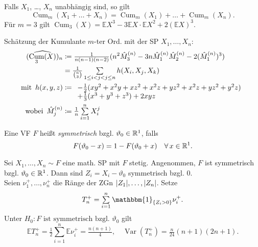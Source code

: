 \documentclass{cheat-sheet}
\newcommand{\E}{\mathbb{E}} %
\newcommand{\ind}{\mathbbm{1}} %
\DeclareMathOperator{\Cum}{Cum} %
\DeclareMathOperator{\var}{Var} %
\begin{document}
\begin{bem}
  Falls $X_1$, \ldots, $X_n$ unabhängig sind, so gilt
  \[ \Cum_m(X_1 + \ldots + X_n) = \Cum_m(X_1) + \ldots + \Cum_m(X_n). \]
  Für $m=3$ gilt $\Cum_3(X) = \E X^3 - 3 \E X \cdot \E X^2 + 2 (\E X)^3$.
\end{bem}

\begin{bsp}
  Schätzung der Kumulante $m$-ter Ord. mit der SP $X_1, \ldots, X_n$:
  \begin{align*}
    (\widehat{\Cum_3(X)})_n & \coloneqq \tfrac{1}{n (n-1) (n-2)} (n^2 \hat{M}_3^{(n)} - 3 n \hat{M}_1^{(n)} \hat{M}_2^{(n)} - 2 (\hat{M}_1^{(n)})^3) \\
    & = \tfrac{1}{\binom{n}{3}} \sum_{1 \leq i < j < j \leq n} h(X_i, X_j, X_k) \\
    \text{mit} \enspace
    h(x, y, z) & \coloneqq \begin{array}[t]{l}
      - \tfrac{1}{2} (xy^2 + x^2 y + x z^2 + x^2 z + y z^2 + x^2 z + y z^2 + y^2 z) \\
      + \tfrac{1}{3} (x^3 + y^3 + z^3) + 2 xyz
    \end{array} \\
    \enspace \text{wobei} \enspace
    \hat{M}_j^{(n)} & \coloneqq \tfrac{1}{n} \sum_{i=1}^n X_i^j
  \end{align*}
\end{bsp}

\begin{defn}
  Eine VF $F$ heißt \emph{symmetrisch} bzgl. $\vartheta_0 \in \mathbb{R}^1$, falls
  \[
    F(\vartheta_0 - x) = 1 - F(\vartheta_0 + x) \quad
    \forall \, x \in \mathbb{R}^1.
  \]
\end{defn}

\begin{bsp}
  Sei $X_1, \ldots, X_n \sim F$ eine math. SP mit $F$ stetig.
  Angenommen, $F$ ist symmetrisch bzgl. $\vartheta_0 \in \mathbb{R}^1$.
  Dann sind $Z_i = X_i - \vartheta_0$ symmetrisch bzgl. $0$. \\
  Seien $\nu_1^{+}, \ldots, \nu_n^{+}$ die Ränge der ZGn $\lvert Z_1\rvert, \ldots, \lvert Z_n\rvert$.
  Setze
  \[ T_n^{+} = \sum_{i=1}^n \ind_{\{ Z_i > 0 \}} \nu_i^{+}. \]
  Unter $H_0 : \text{$F$ ist symmetrisch bzgl. $\vartheta_0$}$ gilt
  \[
    \E T_n^{+} = \tfrac{1}{2} \sum_{i=1}^n \E \nu_i^{+} = \tfrac{n (n+1)}{4}, \quad
    \var(T_n^{+}) = \tfrac{n}{24} (n + 1) (2n + 1).
  \]
\end{bsp}
\end{document}
